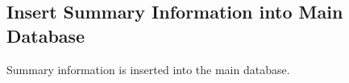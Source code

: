 \documentclass[10pt,a4paper]{article}\usepackage{graphicx, color}
\begin{document}
\subsection{Insert Summary Information into Main Database}
Summary information is inserted into the main database.




\end{document}
